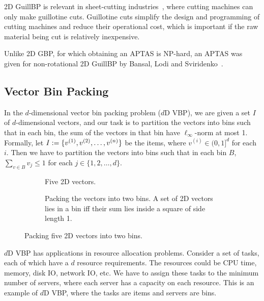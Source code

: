 2D GuillBP is relevant in sheet-cutting
industries~\cite{mchale1999cutting,puchinger2004solving,schneider1988trim},
where cutting machines can only make guillotine cuts.
Guillotine cuts simplify the design and programming of cutting machines
and reduce their operational cost, which is important if
the raw material being cut is relatively inexpensive.

Unlike 2D GBP, for which obtaining an APTAS is NP-hard,
an APTAS was given for non-rotational 2D GuillBP
by Bansal, Lodi and Sviridenko~\cite{bansal2005tale}.

\subsection{Vector Bin Packing}

In the $d$-dimensional vector bin packing problem ($d$D VBP),
we are given a set $I$ of $d$-dimensional vectors,
and our task is to partition the vectors into bins such that in each bin,
the sum of the vectors in that bin have $\ell_\infty$-norm at most 1.
Formally, let $I := \{v^{(1)}, v^{(2)}, \ldots, v^{(n)}\}$ be the items,
where $v^{(i)} \in (0, 1]^d$ for each $i$.
Then we have to partition the vectors into bins such that in each bin $B$,
$\sum_{v \in B} v_j \le 1$ for each $j \in \{1, 2, \ldots, d\}$.

\begin{figure}[htb]
\centering
\begin{subfigure}{0.45\textwidth}
    \centering
    
    \caption{Five 2D vectors.}
\end{subfigure}
\begin{subfigure}{0.54\textwidth}
    \centering
    
    \caption{Packing the vectors into two bins.
    A set of 2D vectors lies in a bin iff their sum
    lies inside a square of side length 1.}
\end{subfigure}
\caption{Packing five 2D vectors into two bins.}
\label{fig:2vbp}
\end{figure}

$d$D VBP has applications in resource allocation problems.
Consider a set of tasks, each of which have a $d$ resource requirements.
The resources could be CPU time, memory, disk IO, network IO, etc.
We have to assign these tasks to the minimum number of servers,
where each server has a capacity on each resource.
This is an example of $d$D VBP, where the tasks are items and servers are bins.

